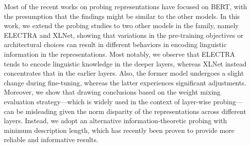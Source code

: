 Most of the recent works on probing representations have focused on BERT, with the presumption that the findings might be similar to the other models. In this work, we extend the probing studies to two other models in the family, namely ELECTRA and XLNet, showing that variations in the pre-training objectives or architectural choices can result in different behaviors in encoding linguistic information in the representations. Most notably, we observe that ELECTRA tends to encode linguistic knowledge in the deeper layers, whereas XLNet instead concentrates that in the earlier layers. Also, the former model undergoes a slight change during fine-tuning, whereas the latter experiences significant adjustments. Moreover, we show that drawing conclusions based on the weight mixing evaluation strategy---which is widely used in the context of layer-wise probing---can be misleading given the norm disparity of the representations across different layers. Instead, we adopt an alternative information-theoretic probing with minimum description length, which has recently been proven to provide more reliable and informative results.
